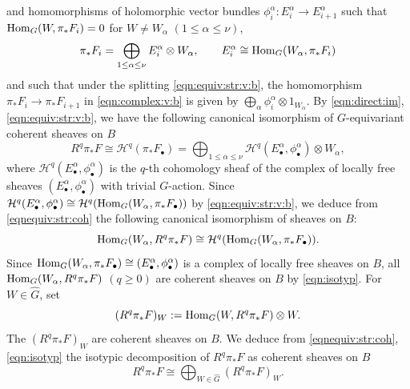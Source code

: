 \documentclass[amscd, leqno]{amsart}
\theoremstyle{plain}
\theoremstyle{definition}
\theoremstyle{remark}
\begin{document}
and homomorphisms of holomorphic vector bundles $\phi_{i}^{\alpha} \colon E_{i}^{\alpha} \to E_{i+1}^{\alpha}$ such that 
${\rm Hom}_{G}(W, \pi_{*}F_{i}) = 0$ for $W \not= W_{\alpha}$ $(1 \leq \alpha \leq \nu)$, 
\begin{equation}
\label{eqn:equiv:str:v:b}
\pi_{*}F_{i} = \bigoplus_{1 \leq \alpha \leq \nu} E_{i}^{\alpha} \otimes W_{\alpha} ,
\qquad
E_{i}^{\alpha} \cong {\rm Hom}_{G}(W_{\alpha}, \pi_{*}F_{i})
\end{equation}
and such that under the splitting \eqref{eqn:equiv:str:v:b}, the homomorphism $\pi_{*}F_{i} \to \pi_{*}F_{i+1}$ in \eqref{eqn:complex:v:b} 
is given by $\bigoplus_{\alpha} \phi_{i}^{\alpha} \otimes 1_{W_{\alpha}}$. 
By \eqref{eqn:direct:im}, \eqref{eqn:equiv:str:v:b}, we have the following canonical isomorphism of $G$-equivariant coherent sheaves on $B$
\begin{equation}
\label{eqnequiv:str:coh}
R^{q}\pi_{*}F \cong {\mathcal H}^{q}(\pi_{*}F_{\bullet}) =
\bigoplus_{1 \leq \alpha \leq \nu} {\mathcal H}^{q}( E_{\bullet}^{\alpha}, \phi_{\bullet}^{\alpha}) \otimes W_{\alpha},
\end{equation}
where ${\mathcal H}^{q}( E_{\bullet}^{\alpha}, \phi_{\bullet}^{\alpha})$ is the $q$-th cohomology sheaf of the complex of locally free sheaves
$( E_{\bullet}^{\alpha}, \phi_{\bullet}^{\alpha})$ with trivial $G$-action. 
Since ${\mathcal H}^{q}( E_{\bullet}^{\alpha}, \phi_{\bullet}^{\alpha}) \cong {\mathcal H}^{q}({\rm Hom}_{G}(W_{\alpha},\pi_{*}F_{\bullet}))$ 
by \eqref{eqn:equiv:str:v:b}, we deduce from \eqref{eqnequiv:str:coh}
the following canonical isomorphism of sheaves on $B$:
\begin{equation}
\label{eqn:isotyp}
{\rm Hom}_{G}(W_{\alpha}, R^{q}\pi_{*}F) \cong {\mathcal H}^{q}({\rm Hom}_{G}(W_{\alpha}, \pi_{*}F_{\bullet})).
\end{equation}
Since ${\rm Hom}_{G}(W_{\alpha},\pi_{*}F_{\bullet}) \cong (E^{\alpha}_{\bullet}, \phi^{\alpha}_{\bullet})$ 
is a complex of locally free sheaves on $B$, 
all ${\rm Hom}_{G}(W_{\alpha},R^{q}\pi_{*}F)$ $(q\geq0)$ are coherent sheaves on $B$ by \eqref{eqn:isotyp}. 
For $W \in \widehat{G}$, set 
$$
(R^{q}\pi_{*}F)_{W} :=  {\rm Hom}_{G}(W,R^{q}\pi_{*}F)\otimes W.
$$
The $(R^{q}\pi_{*}F)_{W}$ are coherent sheaves on $B$.
We deduce from \eqref{eqnequiv:str:coh}, \eqref{eqn:isotyp} the isotypic decomposition of $R^{q}\pi_{*}F$ as coherent sheaves on $B$ 
\begin{equation}
\label{eqn:dir:sum:dir:im}
R^{q}\pi_{*}F \cong \bigoplus_{W\in\widehat{G}} (R^{q}\pi_{*}F)_{W}.
\end{equation}
\end{document}
